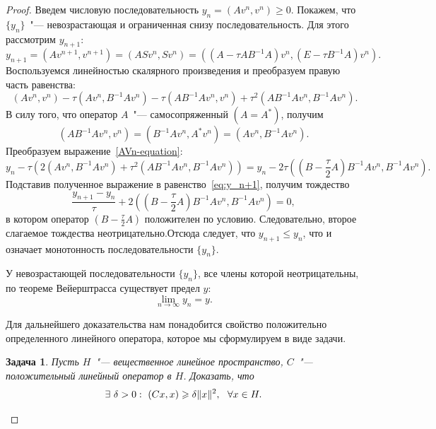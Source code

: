 \documentclass[11pt,a4paper,twoside]{report}
\numberwithin{equation}{section}
\newtheorem*{problem}{Задача}
\theoremstyle{definition}
\theoremstyle{plain}
\DeclarePairedDelimiter\norm{\lVert}{\rVert}
\begin{document}
\begin{proof}
    Введем числовую последовательность $y_n = (Av^n, v^n) \geqslant 0$.
    Покажем, что $\{y_n\}$~"--- невозрастающая и ограниченная снизу
    последовательность. Для этого рассмотрим $y_{n+1}$:
    \begin{equation}
        \label{eq:y_n+1}
        y_{n+1} = (Av^{n+1}, v^{n+1}) = (ASv^n, Sv^n) =
            ((A - {\tau}AB^{-1}A)v^n, (E - {\tau}B^{-1}A)v^n).
    \end{equation}
    Воспользуемся линейностью скалярного произведения и преобразуем
    правую часть равенства:
    \begin{equation}
        \label{AVn-equation}
        ~
        (Av^n, v^n) - \tau (Av^n, B^{-1}Av^n) - \tau (AB^{-1}Av^n, v^n) +
            \tau^2(AB^{-1}Av^n, B^{-1}Av^n).
    \end{equation}
    В силу того, что оператор $A$~"--- самосопряженный $\left(A=A^*\right)$,
    получим
    $$
        \left(AB^{-1}Av^n,v^n\right) = \left(B^{-1}Av^n,A^*v^n\right)=
             \left(Av^n,B^{-1}Av^n\right).
    $$
    Преобразуем выражение~\eqref{AVn-equation}:
    $$
        y_n - \tau\left(2(Av^n, B^{-1}Av^n) +
            \tau^2(AB^{-1}Av^n, B^{-1}Av^n)\right)=
        y_n - 2\tau\left(\left(B - \frac{\tau}{2}A\right)B^{-1}Av^n,
        B^{-1}Av^n\right).
    $$
    Подставив полученное выражение в равенство~\eqref{eq:y_n+1}, получим
    тождество
    \begin{equation}
        \label{eq:wn-1}
        \frac{y_{n+1} - y_n}{\tau} +
        2\left(\left(B - \frac{\tau}{2}A\right)B^{-1}Av^n, B^{-1}Av^n\right)=0,
    \end{equation}
    в котором оператор $\left(B - \frac{\tau}{2}A\right)$
    положителен по условию. Следовательно, второе слагаемое тождества
    неотрицательно.Отсюда следует,
    что $y_{n+1} \leqslant y_n$, что и означает монотонность последовательности
    $\{y_n\}$.

    У невозрастающей последовательности $\{y_n\}$, все члены которой
    неотрицательны, по теореме Вейерштрасса существует предел $y$:
    $$
        \lim_{n \to \infty} y_n = y.
    $$

    Для дальнейшего доказательства нам понадобится свойство
    положительно определенного линейного оператора,
    которое мы сформулируем в виде задачи.
    \begin{problem}
        Пусть $H$~"--- вещественное линейное пространство, $C$~"---
        положительный линейный оператор в $H$. Доказать, что
        \begin{equation}
            \label{eq:delta-prop}
            \exists ~\delta > 0: ~(Cx, x) \geqslant \delta\norm{x}^2,
            ~~\forall x \in H.
        \end{equation}
    \end{problem}


\end{proof}
\end{document}
